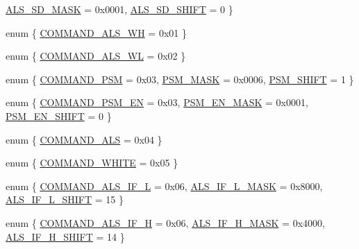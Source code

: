 \begin{DoxyCompactItemize}
\hyperlink{classVEML7700_afba237ed01b4949e9aeb96151f9273b5a2fd5844c6a640f48b67c7bd56f2cc8c0}{A\+L\+S\+\_\+\+S\+D\+\_\+\+M\+A\+SK} = 0x0001, 
\hyperlink{classVEML7700_afba237ed01b4949e9aeb96151f9273b5a786e4e2edfd8bbe8e033a3aec13f410a}{A\+L\+S\+\_\+\+S\+D\+\_\+\+S\+H\+I\+FT} = 0
 \}
\item 
enum \{ \hyperlink{classVEML7700_af00a284cf91c8f469f2ff1af9805fdfbaf2d5b2cc1ae968d5228c83322be1ed9b}{C\+O\+M\+M\+A\+N\+D\+\_\+\+A\+L\+S\+\_\+\+WH} = 0x01
 \}
\item 
enum \{ \hyperlink{classVEML7700_a660a8a0b8955a6a316aa65fbceda8c0fa33d1cafd2cc649dfc04a2e5efdde55f7}{C\+O\+M\+M\+A\+N\+D\+\_\+\+A\+L\+S\+\_\+\+WL} = 0x02
 \}
\item 
enum \{ \hyperlink{classVEML7700_ab29ccdbcd4e170ac8663965e40523012a10105e35082facc6bce9f96ce60e0113}{C\+O\+M\+M\+A\+N\+D\+\_\+\+P\+SM} = 0x03, 
\hyperlink{classVEML7700_ab29ccdbcd4e170ac8663965e40523012a0cf5a09e1bd111e893e0cfc535c227dc}{P\+S\+M\+\_\+\+M\+A\+SK} = 0x0006, 
\hyperlink{classVEML7700_ab29ccdbcd4e170ac8663965e40523012a100f7cf3af8443f352a3030a062e5d17}{P\+S\+M\+\_\+\+S\+H\+I\+FT} = 1
 \}
\item 
enum \{ \hyperlink{classVEML7700_ab9eb0034cdb5c017a8fab52a50390bafa8222ed77749165e06f68103b1908a0ab}{C\+O\+M\+M\+A\+N\+D\+\_\+\+P\+S\+M\+\_\+\+EN} = 0x03, 
\hyperlink{classVEML7700_ab9eb0034cdb5c017a8fab52a50390bafa4430a48be44ce68abe4f34c61340af33}{P\+S\+M\+\_\+\+E\+N\+\_\+\+M\+A\+SK} = 0x0001, 
\hyperlink{classVEML7700_ab9eb0034cdb5c017a8fab52a50390bafaff513cb99fc1bd99f06cf6ed064e3750}{P\+S\+M\+\_\+\+E\+N\+\_\+\+S\+H\+I\+FT} = 0
 \}
\item 
enum \{ \hyperlink{classVEML7700_a2b96be5d4a52744ab8cfa400b4bbd623a0b4d97d359ebed7dda6535f1fdf29887}{C\+O\+M\+M\+A\+N\+D\+\_\+\+A\+LS} = 0x04
 \}
\item 
enum \{ \hyperlink{classVEML7700_addfea724a5192296d3dcc9392e420d0aa45821ad771eb9fdf961211ef411c861d}{C\+O\+M\+M\+A\+N\+D\+\_\+\+W\+H\+I\+TE} = 0x05
 \}
\item 
enum \{ \hyperlink{classVEML7700_a97d56ee9f3e176b36b73d4da40fa3d4aaeb3f59e8f54b7e72689ee0f25ed79307}{C\+O\+M\+M\+A\+N\+D\+\_\+\+A\+L\+S\+\_\+\+I\+F\+\_\+L} = 0x06, 
\hyperlink{classVEML7700_a97d56ee9f3e176b36b73d4da40fa3d4aa806747ccccccd1853f97cccc26151ff1}{A\+L\+S\+\_\+\+I\+F\+\_\+\+L\+\_\+\+M\+A\+SK} = 0x8000, 
\hyperlink{classVEML7700_a97d56ee9f3e176b36b73d4da40fa3d4aa236cddac0f7c78f37a578436901bcb68}{A\+L\+S\+\_\+\+I\+F\+\_\+\+L\+\_\+\+S\+H\+I\+FT} = 15
 \}
\item 
enum \{ \hyperlink{classVEML7700_afecc79a3882992a337dcb7fbd0f29b9ba2ddb21b523a11128c8b09fb056ec6e26}{C\+O\+M\+M\+A\+N\+D\+\_\+\+A\+L\+S\+\_\+\+I\+F\+\_\+H} = 0x06, 
\hyperlink{classVEML7700_afecc79a3882992a337dcb7fbd0f29b9ba1d0aa5abc421a84af1f7b07a1af45fd7}{A\+L\+S\+\_\+\+I\+F\+\_\+\+H\+\_\+\+M\+A\+SK} = 0x4000, 
\hyperlink{classVEML7700_afecc79a3882992a337dcb7fbd0f29b9ba27a522f8d1bc1192f2902c03a913137d}{A\+L\+S\+\_\+\+I\+F\+\_\+\+H\+\_\+\+S\+H\+I\+FT} = 14
 \}
\end{DoxyCompactItemize}
